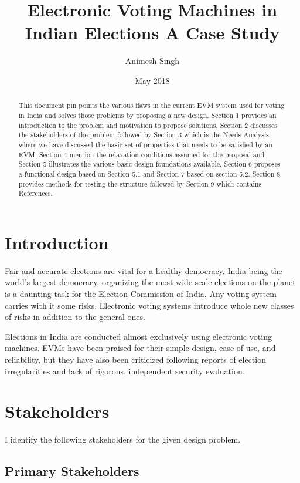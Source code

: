 \documentclass{article}
\title{\textbf{Electronic Voting Machines in Indian Elections}
\linebreak A Case Study}
\author{Animesh Singh}
\date{May 2018}
\begin{document}
\maketitle

\begin{abstract}
This document pin points the various flaws in the current EVM system used for voting in India and solves those problems by proposing a new design. Section 1 provides an introduction to the problem and motivation to propose solutions. Section 2 discusses the stakeholders of the problem followed by Section 3 which is the Needs Analysis where we have discussed the basic set of properties that needs to be satisfied by an EVM. Section 4 mention the relaxation conditions assumed for the proposal and Section 5 illustrates the various basic design foundations available. Section 6 proposes a functional design based on Section 5.1 and Section 7 based on section 5.2. Section 8 provides methods for testing the structure followed by Section 9 which contains References.
\end{abstract}

\section{Introduction}

Fair and accurate elections are vital for a healthy democracy. India being the world's largest democracy, organizing the most wide-scale elections on the planet is a daunting task for the Election Commission of India. Any voting system carries with it some risks. Electronic voting systems introduce whole new classes of risks in addition to the general ones.\par
Elections in India are conducted almost exclusively using electronic voting machines. EVMs have been praised for their simple design, ease of use, and reliability, but they have also been criticized following reports of election irregularities and lack of rigorous, independent security evaluation.


\section{Stakeholders}

I identify the following stakeholders for the given design problem.

\subsection{Primary Stakeholders}
\end{document}
